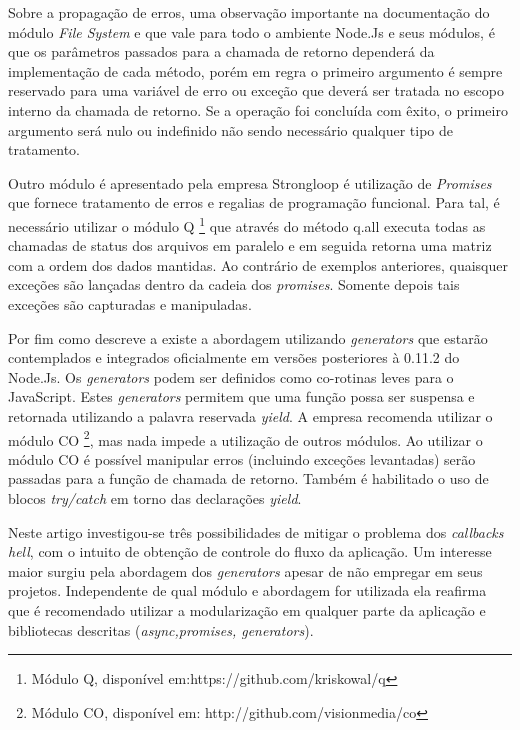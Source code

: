   Sobre a propagação de erros, uma observação importante na documentação do módulo \textit{File System} e que 
  vale para todo o ambiente Node.Js e seus módulos, é que os parâmetros passados para a chamada de retorno dependerá da 
  implementação de cada método, porém em regra o primeiro argumento é sempre reservado para uma variável de erro ou exceção 
  que deverá ser tratada no escopo interno da chamada de retorno. Se a operação foi concluída com êxito, o primeiro argumento 
  será nulo ou indefinido não sendo necessário qualquer tipo de tratamento. \cite{ModuleSystemFs:2014}
  
  Outro módulo é apresentado pela empresa Strongloop é utilização de \textit{Promises} que fornece tratamento de erros
  e regalias de programação funcional. Para tal, é necessário utilizar o módulo Q \footnote{Módulo Q, disponível em:https://github.com/kriskowal/q}
  que através do método q.all executa todas as chamadas de status dos arquivos em paralelo e em seguida retorna uma matriz
  com a ordem dos dados mantidas. Ao contrário de exemplos anteriores, quaisquer exceções são lançadas dentro da cadeia dos
  \textit{promises}. Somente depois tais exceções são capturadas e manipuladas.
  
  Por fim como descreve a  existe a abordagem utilizando \textit{generators} que estarão
  contemplados e integrados oficialmente em versões posteriores à 0.11.2 do Node.Js. Os \textit{generators} podem ser definidos
  como co-rotinas leves para o JavaScript. Estes \textit{generators} permitem que uma função possa ser suspensa e retornada
  utilizando a palavra reservada \textit{yield}. A empresa recomenda utilizar o módulo CO \footnote{Módulo CO, disponível em: http://github.com/visionmedia/co},
  mas nada impede a utilização de outros módulos. Ao utilizar o módulo CO é possível manipular erros (incluindo exceções levantadas)
  serão passadas para a função de chamada de retorno. Também é habilitado o uso de blocos \textit{try/catch} em torno das 
  declarações \textit{yield}.
  
  Neste artigo  investigou-se três possibilidades de mitigar o problema dos \textit{callbacks hell}, com o 
  intuito de obtenção de controle do fluxo da aplicação. Um interesse maior surgiu pela abordagem dos \textit{generators}
  apesar de não empregar em seus projetos. Independente de qual módulo e abordagem for utilizada ela reafirma que é recomendado
  utilizar a modularização em qualquer parte da aplicação e bibliotecas descritas (\textit{async,promises, generators}).
  
